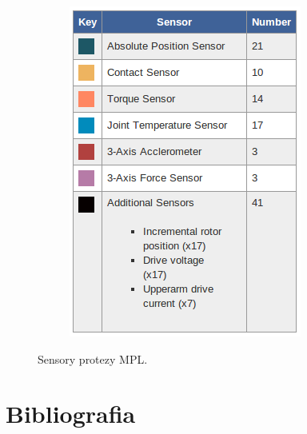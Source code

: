 \documentclass[8pt]{beamer}
\begin{document}
\begin{frame}
\begin{figure}
\begin{center}
\begin{subfigure}[b]{0.4\textwidth}
                		\includegraphics[width=\textwidth]{graphics/mpl_opis.png}
                		\label{graph:g6}
        			\end{subfigure}%
				\end{center}
				\caption{Sensory protezy MPL.}
			\end{figure}
		\end{frame}				
%
	
		
	

\section*{Bibliografia}
\end{document}
